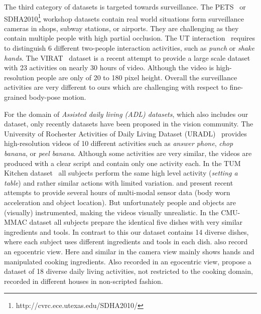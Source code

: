  
The third category of datasets is targeted towards surveillance. The PETS~\citep{ferryman07pets} or SDHA2010\footnote{http://cvrc.ece.utexas.edu/SDHA2010/} workshop datasets contain real world situations form surveillance cameras in shops, subway stations, or airports. They are challenging as they contain multiple people with high partial occlusion. 
The UT interaction~\citep{ryoo09iccv} requires to distinguish 6 different two-people interaction activities, such as \emph{punch} or \emph{shake hands}. %
The VIRAT~\citep{oh11cvpr} dataset is a recent attempt to provide a large scale dataset with 23 activities on nearly 30 hours of video. Although the video is high-resolution people are only of 20 to 180 pixel height. 
Overall the surveillance activities are very different to ours which are challenging with respect to fine-grained body-pose motion.

For the domain of \emph{Assisted daily living (ADL) datasets}, which also includes our dataset, only recently datasets have been proposed in the vision community. The University of Rochester Activities of Daily Living Dataset (URADL)~\citep{messing09iccv} provides high-resolution videos of 10 different activities such as \emph{answer phone}, \emph{chop banana}, or \emph{peel banana}. Although some activities are very similar, the videos are produced with a clear script and contain only one activity each.
%
In the TUM Kitchen dataset~\citep{tenorth09iccw} all subjects perform the same high level activity (\emph{setting a table}) and rather similar actions with limited variation. 
%
\citet{roggen10icnss} and \citet{torre09tr} present recent attempts to provide 
several hours of multi-modal sensor data (\eg body worn acceleration and object location).
But unfortunately people and objects are (visually) instrumented, making the videos visually unrealistic. %
In the CMU-MMAC dataset \citep{torre09tr} all subjects prepare the identical five dishes with very similar ingredients and tools. In contrast to this our dataset contains 14 diverse dishes, where each subject uses different ingredients and tools in each dish. \citeauthor{torre09tr} also record an egocentric view. Here and similar in \citep{farhadi10cvpr,fathi11iccv,stein13acm} the camera view mainly shows hands and manipulated cooking ingredients. Also recorded in an egocentric view, \citet{pirsiavash12cvpr} propose a dataset of 18 diverse daily living activities, not restricted to the cooking domain, recorded in different houses in non-scripted fashion.

